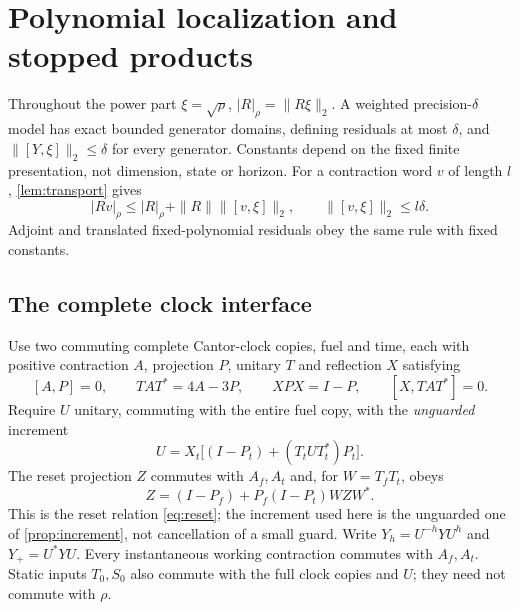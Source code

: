 \section{Polynomial localization and stopped products}\label{sec:power-clock}
Throughout the power part $\xi=\sqrt\rho$, $|R|_\rho=\|R\xi\|_2$. A weighted precision-$\delta$ model has exact bounded generator domains, defining residuals at most $\delta$, and $\|[Y,\xi]\|_2\le\delta$ for every generator. Constants depend on the fixed finite presentation, not dimension, state or horizon. For a contraction word $v$ of length $l$, \cref{lem:transport} gives
\begin{equation}\label{eq:power-transport}
 |Rv|_\rho\le|R|_\rho+\|R\|\|[v,\xi]\|_2,\qquad \|[v,\xi]\|_2\le l\delta.
\end{equation}
Adjoint and translated fixed-polynomial residuals obey the same rule with fixed constants.

\subsection{The complete clock interface}
Use two commuting complete Cantor-clock copies, fuel and time, each with positive contraction $A$, projection $P$, unitary $T$ and reflection $X$ satisfying
\[
 [A,P]=0,\qquad TAT^*=4A-3P,\qquad XPX=I-P,\qquad [X,TAT^*]=0.
\]
Require $U$ unitary, commuting with the entire fuel copy, with the \emph{unguarded} increment
\[
 U=X_t\bigl[(I-P_t)+(T_tUT_t^*)P_t\bigr].
\]
The reset projection $Z$ commutes with $A_f,A_t$ and, for $W=T_fT_t$, obeys
\begin{equation}\label{eq:power-reset}
 Z=(I-P_f)+P_f(I-P_t)WZW^*.
\end{equation}
This is the reset relation \eqref{eq:reset}; the increment used here is the unguarded one of \cref{prop:increment}, not cancellation of a small guard. Write $Y_h=U^{-h}YU^h$ and $Y_+=U^*YU$. Every instantaneous working contraction commutes with $A_f,A_t$. Static inputs $T_0,S_0$ also commute with the full clock copies and $U$; they need not commute with $\rho$.

